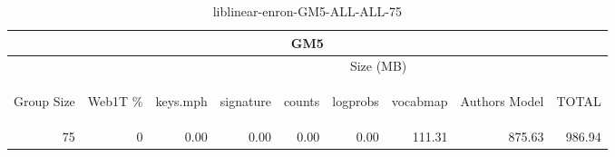 \begin{center}
\begin{table}[htbp]
\begin{tabular}{ | r | r | r | r | r | r | r | r | r |}
\hline
\multicolumn{9}{|c|}{GM5}\\
\hline
 & & \multicolumn{7}{|c|}{Size (MB)}\\ \cline{3-9}
\begin{sideways}Group Size\end{sideways} & \begin{sideways}Web1T \% \end{sideways} & \begin{sideways}keys.mph\end{sideways} & \begin{sideways}signature\end{sideways} & \begin{sideways}counts\end{sideways} & \begin{sideways}logprobs\end{sideways} & \begin{sideways}vocabmap\end{sideways} & \begin{sideways}Authors Model \end{sideways} & \begin{sideways}TOTAL\end{sideways}\\
\hline
\multirow{0}{*}{75}
 & 0 & 0.00 & 0.00 & 0.00 & 0.00 & 111.31 & 875.63 & 986.94\\ \cline{2-9}
\hline
\end{tabular}
\caption{liblinear-enron-GM5-ALL-ALL-75}
\label{table:liblinear-enron-GM5-ALL-ALL-75}
\end{table}
\end{center}

